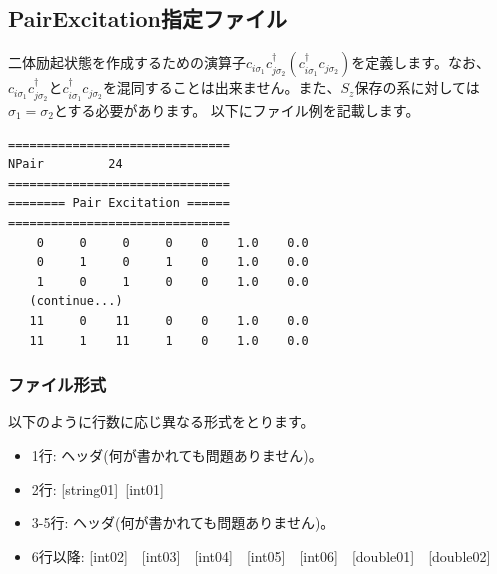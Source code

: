 \newpage
\subsection{{PairExcitation指定ファイル}}
\label{Subsec:pairexcitation}
二体励起状態を作成するための演算子$c_{i\sigma_1}c_{j\sigma_2}^{\dagger}(c_{i\sigma_1}^{\dagger}c_{j\sigma_2})$を定義します。なお、$c_{i\sigma_1}c_{j\sigma_2}^{\dagger}$と$c_{i\sigma_1}^{\dagger}c_{j\sigma_2}$を混同することは出来ません。また、$S_z$保存の系に対しては$\sigma_1=\sigma_2$とする必要があります。
以下にファイル例を記載します。

\begin{minipage}{12.5cm}
\begin{screen}
\begin{verbatim}
===============================
NPair         24
===============================
======== Pair Excitation ======
===============================
    0     0     0     0    0    1.0    0.0
    0     1     0     1    0    1.0    0.0
    1     0     1     0    0    1.0    0.0
   (continue...)
   11     0    11     0    0    1.0    0.0
   11     1    11     1    0    1.0    0.0
\end{verbatim}
\end{screen}
\end{minipage}

\subsubsection{ファイル形式}
以下のように行数に応じ異なる形式をとります。
 \begin{itemize}
   \item  1行:  ヘッダ(何が書かれても問題ありません)。
   \item  2行:   [string01]~[int01]
   \item  3-5行:  ヘッダ(何が書かれても問題ありません)。
   \item  6行以降: [int02]~~[int03]~~[int04]~~[int05]~~[int06]~~[double01]~~[double02]
  \end{itemize}
